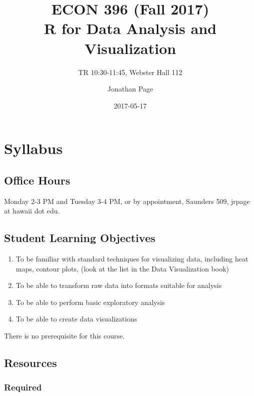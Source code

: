 \documentclass[]{book}
\title{ECON 396 (Fall 2017)\\
R for Data Analysis and Visualization}
\subtitle{TR 10:30-11:45, Webster Hall 112}
\author{Jonathan Page}
\date{2017-05-17}
\providecommand{\tightlist}{%
  \setlength{\itemsep}{0pt}\setlength{\parskip}{0pt}}
\begin{document}
\maketitle

{
\setcounter{tocdepth}{1}
\tableofcontents
}
\chapter*{Syllabus}\label{syllabus}

\section*{Office Hours}\label{office-hours}

Monday 2-3 PM and Tuesday 3-4 PM, or by appointment, Saunders 509,
jrpage at hawaii dot edu.

\section*{Student Learning
Objectives}\label{student-learning-objectives}

\begin{enumerate}
\def\labelenumi{\arabic{enumi}.}
\tightlist
\item
  To be familiar with standard techniques for visualizing data,
  including heat maps, contour plots, (look at the list in the Data
  Visualization book)
\item
  To be able to transform raw data into formats suitable for analysis
\item
  To be able to perform basic exploratory analysis
\item
  To be able to create data visualizations
\end{enumerate}

There is no prerequisite for this course.

\section*{Resources}\label{resources}

\subsection*{Required}\label{required}
\end{document}
